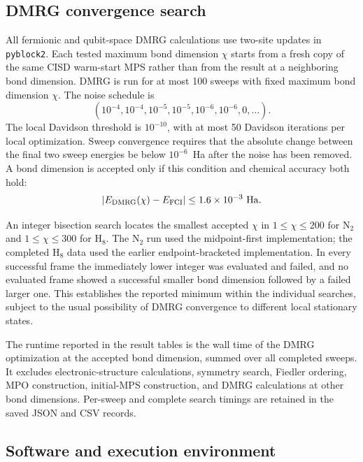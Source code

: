 \documentclass[a4paper,onecolumn,10pt]{article}
\newcommand{\FCI}{\mathrm{FCI}}
\newcommand{\Ha}{\mathrm{Ha}}
\begin{document}
\subsection{DMRG convergence search}

All fermionic and qubit-space DMRG calculations use two-site updates in
\texttt{pyblock2}.  Each tested maximum bond dimension $\chi$ starts from a
fresh copy of the same CISD warm-start MPS rather than from the result at a
neighboring bond dimension.  DMRG is run for at most 100 sweeps with fixed
maximum bond dimension $\chi$.  The noise schedule is
\begin{equation}
    (10^{-4},10^{-4},10^{-5},10^{-5},10^{-6},10^{-6},0,\ldots).
\end{equation}
The local Davidson threshold is $10^{-10}$, with at most 50 Davidson
iterations per local optimization.  Sweep convergence requires that the
absolute change between the final two sweep energies be below $10^{-6}$~Ha
after the noise has been removed.  A bond dimension is accepted only if this
condition and chemical accuracy both hold:
\begin{equation}
    |E_{\rm DMRG}(\chi)-E_{\FCI}|
    \leq 1.6\times10^{-3}\ \Ha.
    \label{eq:chemical-accuracy}
\end{equation}

An integer bisection search locates the smallest accepted $\chi$ in
$1\leq\chi\leq200$ for N$_2$ and $1\leq\chi\leq300$ for H$_8$.  The N$_2$
run used the midpoint-first implementation; the completed H$_8$ data used the
earlier endpoint-bracketed implementation.  In every successful frame the
immediately lower integer was evaluated and failed, and no evaluated frame
showed a successful smaller bond dimension followed by a failed larger one.
This establishes the reported minimum within the individual searches, subject
to the usual possibility of DMRG convergence to different local stationary
states.

The runtime reported in the result tables is the wall time of the DMRG
optimization at the accepted bond dimension, summed over all completed sweeps.
It excludes electronic-structure calculations, symmetry search, Fiedler
ordering, MPO construction, initial-MPS construction, and DMRG calculations
at other bond dimensions.  Per-sweep and complete search timings are retained
in the saved JSON and CSV records.

\subsection{Software and execution environment}
\end{document}
